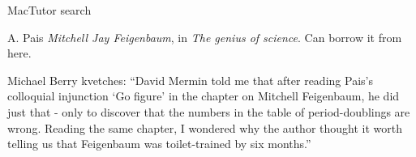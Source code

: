 {MacTutor} search


A. Pais
{\em Mitchell Jay Feigenbaum}, in {\em The genius of science}.
Can borrow it from
 {here}.

Michael Berry
{kvetches}: ``David Mermin told me that after reading Pais's colloquial
injunction `Go figure' in the chapter on Mitchell Feigenbaum, he did just
that - only to discover that the numbers in the table of period-doublings
are wrong. Reading the same chapter, I wondered why the author thought it
worth telling us that Feigenbaum was toilet-trained by six months.''

\printbibliography[heading=subbibintoc,title={References}]
